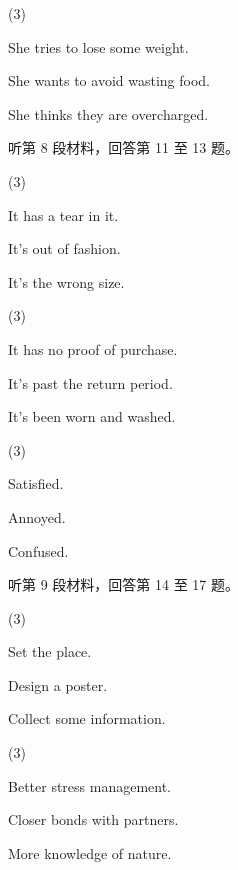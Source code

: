 \documentclass{英语试卷}
\begin{document}
\begin{choices}(3)
  \item She tries to lose some weight.
  \item She wants to avoid wasting food.
  \item She thinks they are overcharged.
\end{choices}
\par 听第 8 段材料，回答第 11 至 13 题。\par
{}
\begin{choices}(3)
  \item It has a tear in it.
  \item It's out of fashion.
  \item It's the wrong size.
\end{choices}
\begin{choices}(3)
  \item It has no proof of purchase.
  \item It's past the return period.
  \item It's been worn and washed.
\end{choices}
\begin{choices}(3)
  \item Satisfied.
  \item Annoyed.
  \item Confused.
\end{choices}
\par 听第 9 段材料，回答第 14 至 17 题。\par
{}
\begin{choices}(3)
  \item Set the place.
  \item Design a poster.
  \item Collect some information.
\end{choices}
\begin{choices}(3)
  \item Better stress management.
  \item Closer bonds with partners.
  \item More knowledge of nature.
\end{choices}
\end{document}
